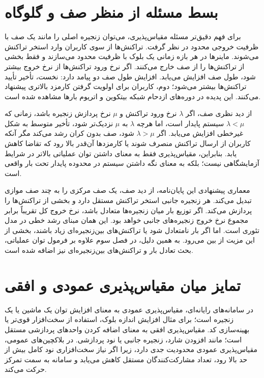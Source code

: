 \section{بسط مسئله از منظر صف و گلوگاه}

برای فهم دقیق‌تر مسئله مقیاس‌پذیری، می‌توان زنجیره اصلی را مانند یک صف با ظرفیت خروجی محدود در نظر گرفت. تراکنش‌ها از سوی کاربران وارد استخر تراکنش می‌شوند. ماینرها در هر بازه زمانی یک بلوک با ظرفیت محدود می‌سازند و فقط بخشی از تراکنش‌ها را از صف خارج می‌کنند. اگر نرخ ورود تراکنش‌ها از نرخ خروج بیشتر شود، طول صف افزایش می‌یابد. افزایش طول صف دو پیامد دارد: نخست، تأخیر تأیید تراکنش‌ها بیشتر می‌شود؛ دوم، کاربران برای اولویت گرفتن کارمزد بالاتری پیشنهاد می‌کنند. این پدیده در دوره‌های ازدحام شبکه بیتکوین و اتریوم بارها مشاهده شده است.

از دید نظری صف، اگر \(\lambda\) نرخ ورود تراکنش و \(\mu\) نرخ پردازش زنجیره باشد، زمانی که \(\lambda < \mu\) سیستم پایدار است، اما هرچه \(\lambda\) به \(\mu\) نزدیک‌تر شود، تأخیر متوسط به شکل غیرخطی افزایش می‌یابد. اگر \(\lambda > \mu\) شود، صف بدون کران رشد می‌کند مگر آنکه کاربران از ارسال تراکنش منصرف شوند یا کارمزدها آن‌قدر بالا رود که تقاضا کاهش یابد. بنابراین، مقیاس‌پذیری فقط به معنای داشتن توان عملیاتی بالاتر در شرایط آزمایشگاهی نیست؛ بلکه به معنای نگه داشتن سیستم در محدوده پایدار تحت بار واقعی است.

معماری پیشنهادی این پایان‌نامه، از دید صف، یک صف مرکزی را به چند صف موازی تبدیل می‌کند. هر زنجیره جانبی استخر تراکنش مستقل دارد و بخشی از تراکنش‌ها را پردازش می‌کند. اگر توزیع بار میان زنجیره‌ها متعادل باشد، نرخ خروج کل تقریباً برابر مجموع نرخ خروج زنجیره‌های جانبی خواهد بود. این همان مبنای رشد خطی در مدل تئوری است. اما اگر بار نامتعادل شود یا تراکنش‌های بین‌زنجیره‌ای زیاد باشند، بخشی از این مزیت از بین می‌رود. به همین دلیل، در فصل سوم علاوه بر فرمول توان عملیاتی، بحث تعادل بار و تراکنش‌های بین‌زنجیره‌ای نیز اضافه شده است.

\section{تمایز میان مقیاس‌پذیری عمودی و افقی}

در سامانه‌های رایانه‌ای، مقیاس‌پذیری عمودی به معنای افزایش توان یک ماشین یا یک زنجیره است؛ برای مثال افزایش اندازه بلوک، استفاده از سخت‌افزار قوی‌تر یا بهینه‌سازی کد. مقیاس‌پذیری افقی به معنای اضافه کردن واحدهای پردازشی مستقل است؛ مانند افزودن شارد، زنجیره جانبی یا نود پردازشی. در بلاکچین‌های عمومی، مقیاس‌پذیری عمودی محدودیت جدی دارد، زیرا اگر نیاز سخت‌افزاری نود کامل بیش از حد بالا رود، تعداد مشارکت‌کنندگان مستقل کاهش می‌یابد و سامانه به سمت تمرکز حرکت می‌کند.

